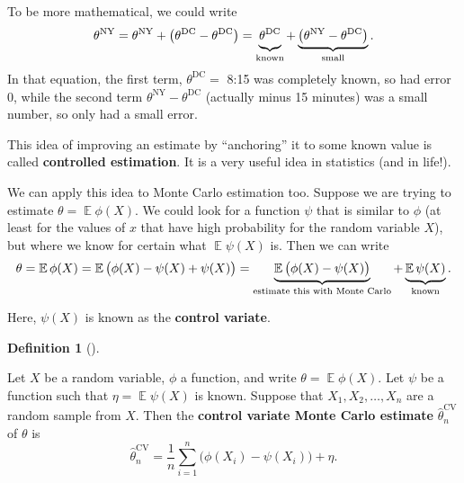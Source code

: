 \documentclass[
  letterpaper,
  DIV=11,
  numbers=noendperiod]{scrreprt}
\newcommand{\Exg}{\operatorname{\mathbb{E}}}
\theoremstyle{plain}
\theoremstyle{definition}
\newtheorem{definition}{Definition}[chapter]
\theoremstyle{definition}
\theoremstyle{remark}
\begin{document}
To be more mathematical, we could write
\[\theta^{\mathrm{NY}} = \theta^{\mathrm{NY}} + \big(\theta^{\mathrm{DC}} - \theta^{\mathrm{DC}}\big) =  \underbrace{\theta^{\mathrm{DC}}\vphantom{\big)}}_{\text{known}} + \underbrace{\big(\theta^{\mathrm{NY}} - \theta^{\mathrm{DC}}\big)}_{\text{small}} . \]
In that equation, the first term, \(\theta^{\mathrm{DC}} =\) 8:15 was
completely known, so had error 0, while the second term
\(\theta^{\mathrm{NY}} - \theta^{\mathrm{DC}}\) (actually minus 15
minutes) was a small number, so only had a small error.

This idea of improving an estimate by ``anchoring'' it to some known
value is called \textbf{controlled estimation}. It is a very useful idea
in statistics (and in life!).

We can apply this idea to Monte Carlo estimation too. Suppose we are
trying to estimate \(\theta = \Exg \phi(X)\). We could look for a
function \(\psi\) that is similar to \(\phi\) (at least for the values
of \(x\) that have high probability for the random variable \(X\)), but
where we know for certain what \(\Exg \psi(X)\) is. Then we can write
\[ \theta = \Exg \phi(X) = \Exg \big(\phi(X) - \psi(X) + \psi(X)\big) = \underbrace{\Exg\big(\phi(X) - \psi(X)\big)}_{\text{estimate this with Monte Carlo}} + \underbrace{\Exg \psi(X)\vphantom{\big)}}_{\text{known}} . \]

Here, \(\psi(X)\) is known as the \textbf{control variate}.

\begin{definition}[]\protect\hypertarget{def-MCest}{}\label{def-MCest}

Let \(X\) be a random variable, \(\phi\) a function, and write
\(\theta = \Exg\phi(X)\). Let \(\psi\) be a function such that
\(\eta = \Exg\psi(X)\) is known. Suppose that \(X_1, X_2, \dots, X_n\)
are a random sample from \(X\). Then the \textbf{control variate Monte
Carlo estimate} \(\widehat\theta_n^{\mathrm{CV}}\) of \(\theta\) is
\[ \widehat{\theta}_n^{\mathrm{CV}} = \frac{1}{n} \sum_{i=1}^n \big(\phi(X_i) - \psi(X_i)\big) + \eta . \]

\end{definition}
\end{document}
